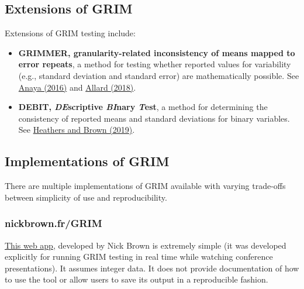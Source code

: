\documentclass[letterpaper, 12pt]{article}
\begin{document}
\subsection*{Extensions of GRIM}

Extensions of GRIM testing include:

\begin{itemize}
    \setlength\itemsep{-0.5em}
    \item \textbf{GRIMMER, granularity-related inconsistency of means mapped to error repeats}, a method for testing whether reported values for variability (e.g., standard deviation and standard error) are mathematically possible. See \href{https://doi.org/10.7287/peerj.preprints.2400v1}{Anaya (2016)} and \href{https://aurelienallard.netlify.app/post/anaytic-grimmer-possibility-standard-deviations/}{Allard (2018)}.
    \item \textbf{DEBIT, \textit{DE}scriptive \textit{BI}nary \textit{T}est}, a method for determining the consistency of reported means and standard deviations for binary variables. See \href{https://doi.org/10.17605/OSF.IO/PM825}{Heathers and Brown (2019)}.
\end{itemize}

\subsection*{Implementations of GRIM}

There are multiple implementations of GRIM available with varying trade-offs between simplicity of use and reproducibility.

\subsubsection*{nickbrown.fr/GRIM}

\href{http://nickbrown.fr/GRIM}{This web app}, developed by Nick Brown is extremely simple (it was developed explicitly for running GRIM testing in real time while watching conference presentations). It assumes integer data. It does not provide documentation of how to use the tool or allow users to save its output in a reproducible fashion.

\begin{comment}
Reese: Screenshot here is not really necessary, I feel.
\begin{figure}[h!]
    \centering
    \texttt{[image: img/grim/nickbrown's grim test.png]}
    \caption{Screenshot of Nick Brown's web app}
\end{figure}
\end{comment}
\end{document}
